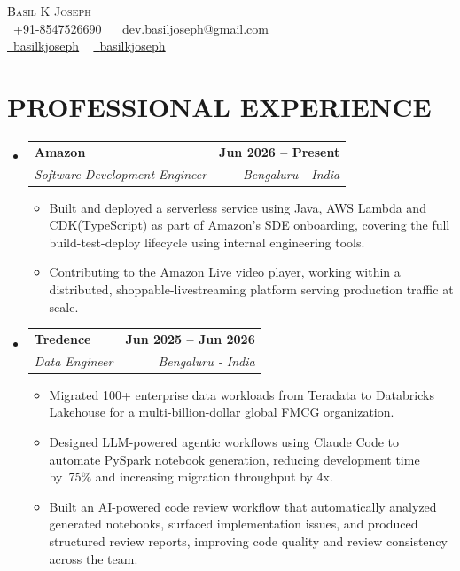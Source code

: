 \documentclass[letterpaper,11pt]{article}
\makeatletter
\newcommand{\resumeItem}[1]{
  \item\small{
    {#1 \vspace{-2pt}}
  }
}
\newcommand{\resumeSubheading}[4]{
  \vspace{-2pt}\item
    \begin{tabular*}{1.0\textwidth}[t]{l@{\extracolsep{\fill}}r}
      \textbf{\large#1} & \textbf{\small #2} \\
      \textit{\large#3} & \textit{\small #4} \\
      
    \end{tabular*}\vspace{-7pt}
}
\newcommand{\resumeSubHeadingListStart}{\begin{itemize}[leftmargin=0.0in, label={}]}
\newcommand{\resumeSubHeadingListEnd}{\end{itemize}}
\newcommand{\resumeItemListStart}{\begin{itemize}}
\newcommand{\resumeItemListEnd}{\end{itemize}\vspace{-5pt}}
\makeatother
\begin{document}


\begin{center}
    {\Huge \scshape Basil K Joseph} \\ \vspace{3pt}
    \small \href{tel:+91 8547526690}{ \raisebox{-0.1\height}\faPhone\ \underline{+91-8547526690} ~} \href{mailto:dev.basiljoseph@gmail.com}{\raisebox{-0.2\height}\faEnvelope\  \underline{dev.basiljoseph@gmail.com}} ~ \\
    \href{https://github.com/basilkjoseph}{\raisebox{-0.2\height}\faGithub\ \underline{basilkjoseph}} ~
    \href{https://linkedin.com/in/basilkjoseph}{\raisebox{-0.2\height}\faLinkedinSquare\ \underline{basilkjoseph}}  ~
    \vspace{-8pt}
\end{center}

    \vspace{-2pt}




\section{PROFESSIONAL EXPERIENCE}
    \resumeSubHeadingListStart
        \resumeSubheading{Amazon \href{Certificate Proof link}{ } }{Jun 2026 -- Present}{{Software Development Engineer}}{Bengaluru - India}
            \resumeItemListStart
                \resumeItem{\normalsize{Built and deployed a serverless service using Java, AWS Lambda and CDK(TypeScript) as part of Amazon's SDE onboarding, covering the full build-test-deploy lifecycle using internal engineering tools.}}
                \resumeItem{\normalsize{Contributing to the Amazon Live video player, working within a distributed, shoppable-livestreaming platform serving production traffic at scale.}}
            \resumeItemListEnd
    \resumeSubHeadingListEnd

    \vspace{-15pt}

    \resumeSubHeadingListStart
        \resumeSubheading{Tredence \href{Certificate Proof link}{ } }{Jun 2025 -- Jun 2026}{{Data Engineer}}{Bengaluru - India}
            \resumeItemListStart
                \resumeItem{\normalsize{Migrated 100+ enterprise data workloads from Teradata to Databricks Lakehouse for a multi-billion-dollar global FMCG organization.}}
                \resumeItem{\normalsize{Designed LLM-powered agentic workflows using Claude Code to automate PySpark notebook generation, reducing development time by~75\% and increasing migration throughput by 4x.}}
                \resumeItem{\normalsize{Built an AI-powered code review workflow that automatically analyzed generated notebooks, surfaced implementation issues, and produced structured review reports, improving code quality and review consistency across the team.}}
            \resumeItemListEnd
    \resumeSubHeadingListEnd
\end{document}
